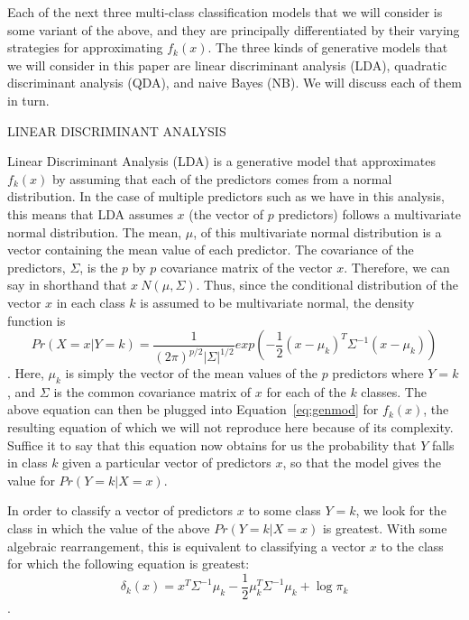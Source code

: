 \documentclass[12pt]{article}
\begin{document}
Each of the next three multi-class classification models that we will consider is some 
variant of the above, and they are principally differentiated by their varying strategies 
for approximating $f_k(x)$.  The three kinds of generative models that we will consider 
in this paper are linear discriminant analysis (LDA), quadratic discriminant analysis 
(QDA), and naive Bayes (NB).  We will discuss each of them in turn.  

LINEAR DISCRIMINANT ANALYSIS

Linear Discriminant Analysis (LDA) is a generative model that approximates $f_k(x)$ by 
assuming that each of the predictors comes from a normal distribution.  In the case of 
multiple predictors such as we have in this analysis, this means that LDA assumes $x$ 
(the vector of $p$ predictors) follows a multivariate normal distribution.  The mean, 
$\mu$, of this multivariate normal distribution is a vector containing the mean value 
of each predictor.  The covariance of the predictors, $\Sigma$, is the $p$ by $p$ 
covariance matrix of the vector $x$.  Therefore, we can say in shorthand that 
$x ~ N(\mu,\Sigma)$.  Thus, since the conditional distribution of the vector $x$ in 
each class $k$ is assumed to be multivariate normal, the density function is 
$$Pr(X = x|Y = k) = \frac {1} {(2\pi) ^ {p/2} |\Sigma| ^ 
{1/2}} exp(-\frac{1}{2}   (x - \mu_k) ^ T \Sigma ^ {-1} (x - \mu_k))$$.  
Here, $\mu_k$ is simply the vector of the mean values of the $p$ predictors where 
$Y = k$, and $\Sigma$ is the common covariance matrix of $x$ for each of the $k$ 
classes.  The above equation can then be plugged into Equation~\eqref{eq:genmod} 
for $f_k(x)$, the resulting equation of which we will not reproduce here because of 
its complexity.  Suffice it to say that this equation now obtains for us the probability 
that $Y$ falls in class $k$ given a particular vector of predictors $x$, so that the 
model gives the value for $Pr(Y = k|X = x)$.

In order to classify a vector of predictors $x$ to some class $Y = k$, we look for the 
class in which the value of the above $Pr(Y = k|X = x)$ is greatest.  With some 
algebraic rearrangement, this is equivalent to classifying a vector $x$ to the 
class for which the following equation is greatest:
\begin{equation}
  \label{eq:disscore}
  \delta_k(x) = x ^ T \Sigma ^ {-1} \mu_k - 
  \frac {1} {2} \mu_k ^ T \Sigma ^ {-1} \mu_k + \log {\pi_k}
\end{equation}. 
\end{document}
